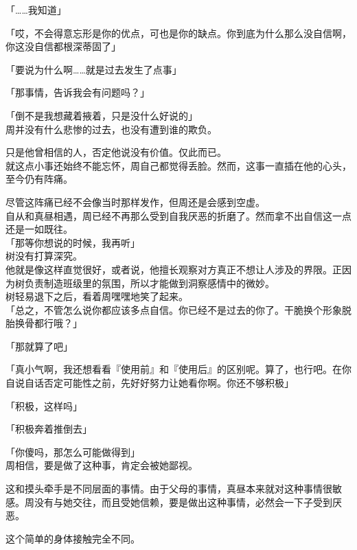 「……我知道」

「哎，不会得意忘形是你的优点，可也是你的缺点。你到底为什么那么没自信啊，你这没自信都根深蒂固了」

「要说为什么啊……就是过去发生了点事」

「那事情，告诉我会有问题吗？」

「倒不是我想藏着掖着，只是没什么好说的」\\

周并没有什么悲惨的过去，也没有遭到谁的欺负。

只是他曾相信的人，否定他说没有价值。仅此而已。\\

就这点小事还始终不能忘怀，周自己都觉得丢脸。然而，这事一直插在他的心头，至今仍有阵痛。

尽管这阵痛已经不会像当时那样发作，但周还是会感到空虚。\\

自从和真昼相遇，周已经不再那么受到自我厌恶的折磨了。然而拿不出自信这一点还是一如既往。\\

「那等你想说的时候，我再听」\\

树没有打算深究。\\

他就是像这样直觉很好，或者说，他擅长观察对方真正不想让人涉及的界限。正因为树负责制造班级里的氛围，所以才能做到洞察感情中的微妙。\\

树轻易退下之后，看着周嘿嘿地笑了起来。\\

「总之，不管怎么说你都应该多点自信。你已经不是过去的你了。干脆换个形象脱胎换骨都行哦？」

「那就算了吧」

「真小气啊，我还想看看『使用前』和『使用后』的区别呢。算了，也行吧。在你自说自话否定可能性之前，先好好努力让她看你啊。你还不够积极」

「积极，这样吗」

「积极奔着推倒去」

「你傻吗，那怎么可能做得到」\\

周相信，要是做了这种事，肯定会被她鄙视。

这和摸头牵手是不同层面的事情。由于父母的事情，真昼本来就对这种事情很敏感。周没有与她交往，而且受她信赖，要是做出这种事情，必然会一下子受到厌恶。

这个简单的身体接触完全不同。\\

